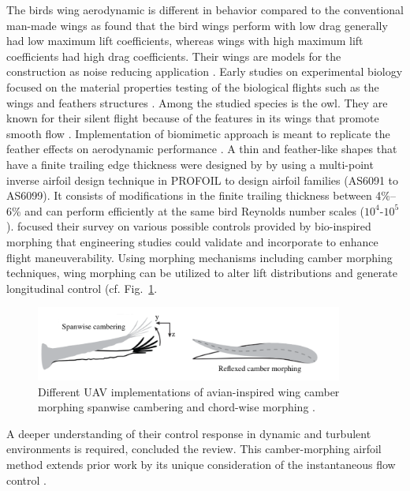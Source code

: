 \documentclass[conf]{new-aiaa}
\begin{document}
The birds wing aerodynamic is different in behavior compared to the conventional man-made wings as \citet{withers1981aerodynamic} found that the bird wings perform with low drag generally had low maximum lift coefficients, whereas wings with high maximum lift coefficients had high drag coefficients. 
%
Their wings are models for the construction as noise reducing application \cite{bachmann2010anatomical}.
%
Early studies on experimental biology focused on the material properties testing of the biological flights such as the wings and feathers structures \cite{bachmann2012flexural}.
%
Among the studied species is the owl. They are known for their silent flight because of the features in its wings that promote smooth flow \cite{jaworski2020aeroacoustics,geyer2016silent}.
% 
Implementation of biomimetic approach is meant to replicate the feather effects on aerodynamic performance \cite{hedenstrom2017wind}. 
%
A thin and feather-like shapes that have a finite trailing edge thickness were designed by \citet{ananda2018aerodynamic} by using a multi-point inverse airfoil design technique in PROFOIL \cite{AirfoilDesignSoftwarefortheWeb} to design airfoil families (AS6091 to AS6099).
%
It consists of modifications in the finite trailing thickness between 4\%–6\% and can perform efficiently at the same bird Reynolds number scales ($10^4$-$10^5$).
%
\citet{harvey2022review} focused their survey on various possible controls provided by bio-inspired morphing that engineering studies could validate and incorporate to enhance flight maneuverability.
%
Using morphing mechanisms including camber morphing techniques, wing morphing can be utilized to alter lift distributions and generate longitudinal control (cf. Fig.~\ref{fig:camberMorphing}.
%
\begin{figure}[hbt!]
\centering
\includegraphics[width=0.9\textwidth]{figs/morph-crop.pdf}
\caption{Different UAV implementations of avian-inspired wing camber morphing spanwise cambering and chord-wise morphing \cite{harvey2022review}.}
\label{fig:camberMorphing} 
\end{figure}
%
A deeper understanding of their control response in dynamic and turbulent environments is required, concluded the review.
%
This camber-morphing airfoil method extends prior work by its unique consideration of the instantaneous flow control \cite{gamble2020aeroelastic,gamble2020load}.
\end{document}
